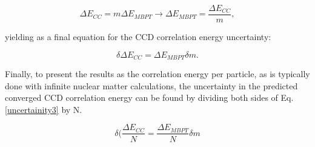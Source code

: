 \begin{equation}
    \Delta E_{CC} = m\Delta E_{MBPT} \longrightarrow \Delta E_{MBPT} = \frac{\Delta E_{CC}}{m},
\end{equation}

yielding as a final equation for the CCD correlation energy uncertainty:

\begin{equation}\label{uncertainity3}
    \delta \Delta E_{CC} = \Delta E_{MBPT}\delta m.
\end{equation}

Finally, to present the results as the correlation energy per particle, as is typically done with infinite nuclear matter calculations, the uncertainty in the predicted converged CCD correlation energy can be found by dividing both sides of Eq. \ref{uncertainity3} by N.

\begin{equation}
    \delta (\frac{\Delta E_{CC}}{N} = \frac{\Delta E_{MBPT}}{N}\delta m
\end{equation}